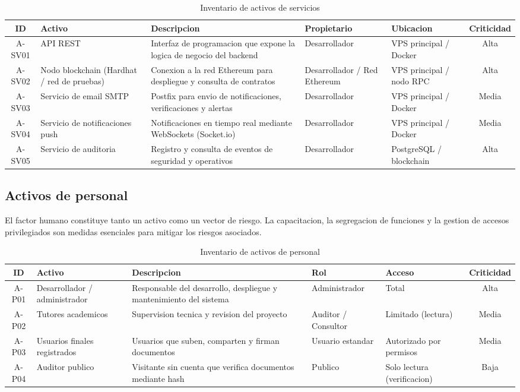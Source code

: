\documentclass[11pt, a4paper]{article}
\begin{document}
\begin{table}[H]
\centering
\renewcommand{\arraystretch}{1.4}
\small
\begin{tabular}{|c|l|p{4.5cm}|l|l|c|}
\hline
\textbf{ID} & \textbf{Activo} & \textbf{Descripcion} & \textbf{Propietario} & \textbf{Ubicacion} & \textbf{Criticidad} \\
\hline
A-SV01 & API REST & Interfaz de programacion que expone la logica de negocio del backend & Desarrollador & VPS principal / Docker & Alta \\
\hline
A-SV02 & Nodo blockchain (Hardhat / red de pruebas) & Conexion a la red Ethereum para despliegue y consulta de contratos & Desarrollador / Red Ethereum & VPS principal / nodo RPC & Alta \\
\hline
A-SV03 & Servicio de email SMTP & Postfix para envio de notificaciones, verificaciones y alertas & Desarrollador & VPS principal / Docker & Media \\
\hline
A-SV04 & Servicio de notificaciones push & Notificaciones en tiempo real mediante WebSockets (Socket.io) & Desarrollador & VPS principal / Docker & Media \\
\hline
A-SV05 & Servicio de auditoria & Registro y consulta de eventos de seguridad y operativos & Desarrollador & PostgreSQL / blockchain & Alta \\
\hline
\end{tabular}
\caption{Inventario de activos de servicios}
\label{tab:activos-servicios}
\end{table}

\subsection{Activos de personal}

El factor humano constituye tanto un activo como un vector de riesgo. La capacitacion, la segregacion de funciones y la gestion de accesos privilegiados son medidas esenciales para mitigar los riesgos asociados.

\begin{table}[H]
\centering
\renewcommand{\arraystretch}{1.4}
\small
\begin{tabular}{|c|l|p{5cm}|l|l|c|}
\hline
\textbf{ID} & \textbf{Activo} & \textbf{Descripcion} & \textbf{Rol} & \textbf{Acceso} & \textbf{Criticidad} \\
\hline
A-P01 & Desarrollador / administrador & Responsable del desarrollo, despliegue y mantenimiento del sistema & Administrador & Total & Alta \\
\hline
A-P02 & Tutores academicos & Supervision tecnica y revision del proyecto & Auditor / Consultor & Limitado (lectura) & Media \\
\hline
A-P03 & Usuarios finales registrados & Usuarios que suben, comparten y firman documentos & Usuario estandar & Autorizado por permisos & Media \\
\hline
A-P04 & Auditor publico & Visitante sin cuenta que verifica documentos mediante hash & Publico & Solo lectura (verificacion) & Baja \\
\hline
\end{tabular}
\caption{Inventario de activos de personal}
\label{tab:activos-personal}
\end{table}
\end{document}
